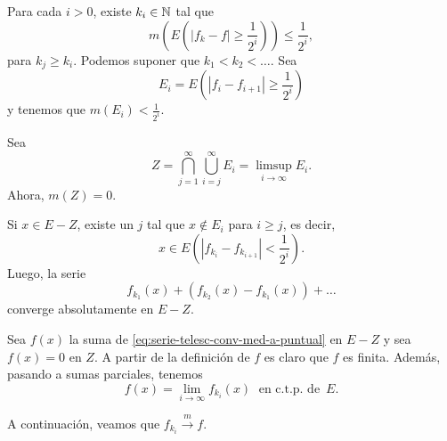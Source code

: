 \begin{demo}
Para cada $i>0$, existe $k_i\in \mathbb{N}$ tal que 
\[
m\left(E\left(|f_k-f|\geq \frac{1}{2^i}\right)\right)\leq
\frac{1}{2^i},
\]
para $k_j\geq k_i$.
Podemos suponer que $k_1<k_2<\ldots$. Sea 
\[
E_i=E\left(   |f_{i} -f_{i+1}|\geq \frac{1}{2^i}\right)
\]
y tenemos que $m(E_i)<\frac{1}{2^i}$. 

Sea 
\[ Z=\bigcap\limits_{j=1}^{\infty}\bigcup\limits_{i=j}^{\infty} E_i
=\limsup\limits_{i \to \infty} E_i.
\]
Ahora, $m(Z)=0$. 

Si $x \in E-Z$, existe un $j$ tal que $x \notin E_i$ para $i\geq j$, es decir, 
\[
x\in E\left( \left|f_{k_i}-f_{k_{i+1}}\right|<\frac{1}{2^i}\right).
\]
Luego, la serie
\begin{equation}\label{eq:serie-telesc-conv-med-a-puntual}
f_{k_1}(x)+\left(f_{k_2}(x)-f_{k_1}(x)\right)+\ldots
\end{equation}
converge absolutamente en $E-Z$.

Sea $f(x)$ la suma de \eqref{eq:serie-telesc-conv-med-a-puntual} en $E-Z$ y sea $f(x)=0$ en $Z$. A partir de la definici\'on de $f$ es claro que $f$ es finita. Adem\'as, pasando a sumas parciales, tenemos
\[
f(x)=\lim\limits_{i \to \infty} f_{k_i}(x)\;\mbox{ en c.t.p. de } \,E.
\]

A continuaci\'on, veamos que $f_{k_i} \xrightarrow[]{m} f$.


\end{demo}
